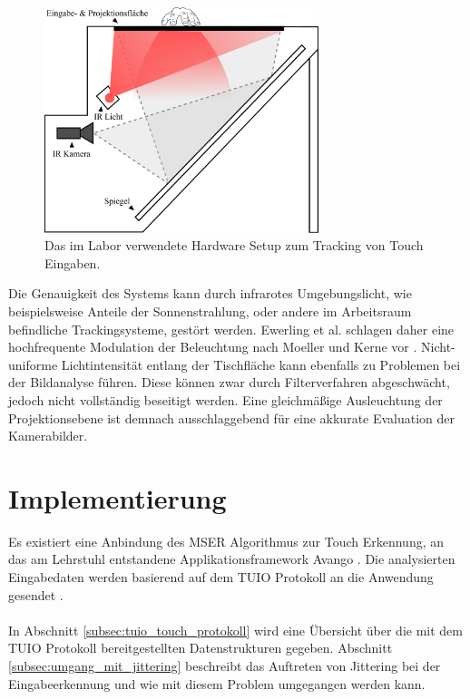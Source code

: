 \begin{figure}
	\begin{center}
		\includegraphics[width=8cm]{img/table_setup.pdf}
	\end{center}
	\caption{Das im Labor verwendete Hardware Setup zum Tracking von Touch Eingaben.}
	\label{fig:table_setup}
\end{figure}

Die Genauigkeit des Systems kann durch infrarotes Umgebungslicht, wie beispielsweise Anteile der Sonnenstrahlung, oder andere im Arbeitsraum befindliche Trackingsysteme, gestört werden. Ewerling et al. schlagen daher eine hochfrequente Modulation der Beleuchtung nach Moeller und Kerne vor \cite{ewerling:2012, moeller:2012}.  Nicht-uniforme \linebreak Lichtintensität entlang der Tischfläche kann ebenfalls zu Problemen bei der Bildanalyse führen. Diese können zwar durch Filterverfahren abgeschwächt, jedoch nicht vollständig beseitigt werden. Eine gleichmäßige Ausleuchtung der Projektionsebene ist demnach ausschlaggebend für eine akkurate Evaluation der Kamerabilder.


\section{Implementierung}
\label{sec:implementierung_mser}
Es existiert eine Anbindung des MSER Algorithmus zur Touch Erkennung, an das am Lehrstuhl entstandene Applikationsframework Avango \cite{avango:2011}. Die analysierten Eingabedaten werden basierend auf dem TUIO Protokoll an die Anwendung gesendet \cite{tuio}.
\\\\
In Abschnitt \ref{subsec:tuio_touch_protokoll} wird eine Übersicht über die mit dem TUIO Protokoll bereitgestellten Datenstrukturen gegeben. Abschnitt \ref{subsec:umgang_mit_jittering} beschreibt das Auftreten von Jittering bei der Eingabeerkennung und wie mit diesem Problem umgegangen werden kann.


